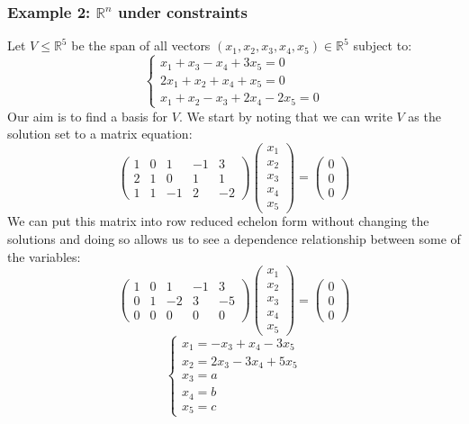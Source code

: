 \documentclass[12pt]{article}
\begin{document}
\subsubsection*{Example 2: \(\mathbb{R}^n\) under constraints}
Let \(V\leqslant\mathbb{R}^5\) be the span of all vectors \((x_1,x_2,x_3,x_4,x_5)\in\mathbb{R}^5\) subject to:
\[\begin{cases}
    x_1+x_3-x_4+3x_5=0 \\
    2x_1+x_2+x_4+x_5= 0 \\
    x_1+x_2-x_3+2x_4-2x_5=0
\end{cases}\]
Our aim is to find a basis for \(V\). We start by noting that we can write \(V\) as the solution set to a matrix equation:
\[\begin{pmatrix}
    1 & 0 & 1 & -1 & 3 \\
    2 & 1 &0 & 1 & 1 \\
    1 & 1 & -1 & 2 & -2
\end{pmatrix}\begin{pmatrix}
    x_1 \\
    x_2 \\
    x_3 \\
    x_4 \\
    x_5
\end{pmatrix}=\begin{pmatrix}
    0 \\
    0 \\
    0
\end{pmatrix}\]
We can put this matrix into row reduced echelon form without changing the solutions and doing so allows us to see a dependence relationship between some of the variables:
\[\begin{pmatrix}
    1 & 0 & 1 & -1 & 3 \\
    0 & 1 & -2 & 3 & -5 \\
    0 & 0 & 0 & 0 & 0
\end{pmatrix}\begin{pmatrix}
    x_1 \\
    x_2 \\
    x_3 \\
    x_4 \\
    x_5
\end{pmatrix}=\begin{pmatrix}
    0 \\
    0 \\
    0
\end{pmatrix}\]
\[\begin{cases}
    x_1 = -x_3 + x_4 - 3x_5 \\
    x_2 = 2x_3 -3x_4 + 5x_5 \\
    x_3 = a \\
    x_4 = b \\
    x_5 = c
\end{cases}\]
\end{document}
